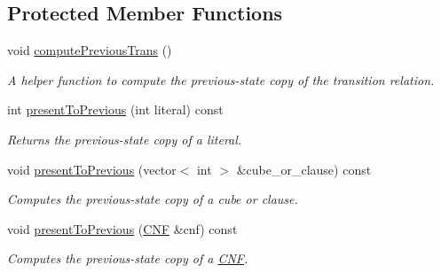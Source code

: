 \subsection*{Protected Member Functions}
\begin{DoxyCompactItemize}
\item 
void \hyperlink{classParallelLearner_a2b87f1f2526786a4402d695026272d33}{compute\-Previous\-Trans} ()
\begin{DoxyCompactList}\small\item\em A helper function to compute the previous-\/state copy of the transition relation. \end{DoxyCompactList}\item 
int \hyperlink{classParallelLearner_aa97595b50d1bba411824c2a60337e081}{present\-To\-Previous} (int literal) const 
\begin{DoxyCompactList}\small\item\em Returns the previous-\/state copy of a literal. \end{DoxyCompactList}\item 
void \hyperlink{classParallelLearner_ae3330a141c8ba3ca7c5687824dbf4edc}{present\-To\-Previous} (vector$<$ int $>$ \&cube\-\_\-or\-\_\-clause) const 
\begin{DoxyCompactList}\small\item\em Computes the previous-\/state copy of a cube or clause. \end{DoxyCompactList}\item 
void \hyperlink{classParallelLearner_acce71499ce9d8672116139f231376151}{present\-To\-Previous} (\hyperlink{classCNF}{C\-N\-F} \&cnf) const 
\begin{DoxyCompactList}\small\item\em Computes the previous-\/state copy of a \hyperlink{classCNF}{C\-N\-F}. \end{DoxyCompactList}\end{DoxyCompactItemize}
